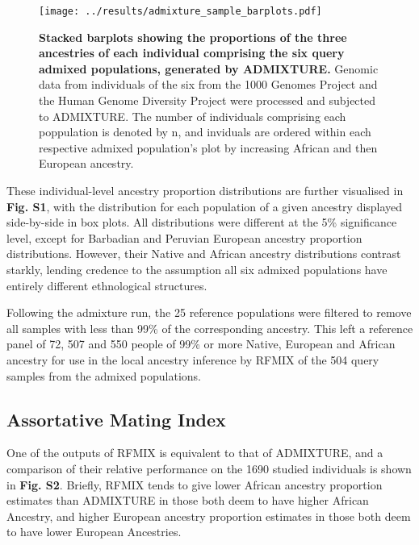 \documentclass[11pt]{article}
\begin{document}
\begin{figure}[htb!]%
    \centering
    \texttt{[image: 
        ../results/admixture\_sample\_barplots.pdf]} 
    \vspace{-.25cm}
    \caption{\textbf{
        Stacked barplots showing the proportions of the three ancestries of each individual comprising the six query admixed populations, generated by ADMIXTURE.
    }
        Genomic data from individuals of the six from the 1000 Genomes Project and the Human Genome Diversity Project were processed and subjected to ADMIXTURE. The number of individuals comprising each poppulation is denoted by n, and inviduals are ordered within each respective admixed population's plot by increasing African and then European ancestry.
    }
\end{figure}





These individual-level ancestry proportion distributions are further visualised in \textbf{Fig. S1}, with the distribution for each population of a given ancestry displayed side-by-side in box plots. All distributions were different at the 5\% significance level, except for Barbadian and Peruvian European ancestry proportion distributions. However, their Native and African ancestry distributions contrast starkly, lending credence to the assumption all six admixed populations have entirely different ethnological structures.

Following the admixture run, the 25 reference populations were filtered to remove all samples with less than 99\% of the corresponding ancestry. This left a reference panel of 72, 507 and 550 people of 99\% or more Native, European and African ancestry for use in the local ancestry inference by RFMIX of the 504 query samples from the admixed populations. 









\subsection{Assortative Mating Index}





One of the outputs of RFMIX is equivalent to that of ADMIXTURE, and a comparison of their relative performance on the 1690 studied individuals is shown in \textbf{Fig. S2}. Briefly, RFMIX tends to give lower African ancestry proportion estimates than ADMIXTURE in those both deem to have higher African Ancestry, and higher European ancestry proportion estimates in those both deem to have lower European Ancestries. 
\end{document}
